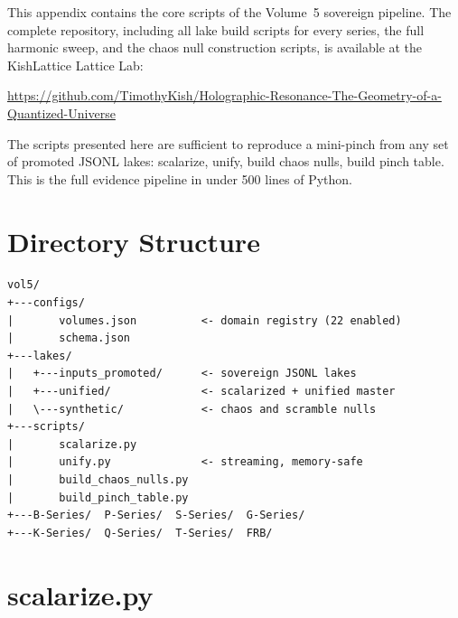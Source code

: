 \documentclass[11pt, letterpaper, openany]{book}
\begin{document}
This appendix contains the core scripts of the Volume~5 sovereign pipeline. The complete
repository, including all lake build scripts for every series, the full harmonic sweep, and
the chaos null construction scripts, is available at the KishLattice Lattice Lab:

\begin{center}
\url{https://github.com/TimothyKish/Holographic-Resonance-The-Geometry-of-a-Quantized-Universe}
\end{center}

The scripts presented here are sufficient to reproduce a mini-pinch from any set of promoted
JSONL lakes: scalarize, unify, build chaos nulls, build pinch table. This is the full
evidence pipeline in under 500 lines of Python.

\section{Directory Structure}

\begin{verbatim}
vol5/
+---configs/
|       volumes.json          <- domain registry (22 enabled)
|       schema.json
+---lakes/
|   +---inputs_promoted/      <- sovereign JSONL lakes
|   +---unified/              <- scalarized + unified master
|   \---synthetic/            <- chaos and scramble nulls
+---scripts/
|       scalarize.py
|       unify.py              <- streaming, memory-safe
|       build_chaos_nulls.py
|       build_pinch_table.py
+---B-Series/  P-Series/  S-Series/  G-Series/
+---K-Series/  Q-Series/  T-Series/  FRB/
\end{verbatim}

\section{scalarize.py}
\end{document}

